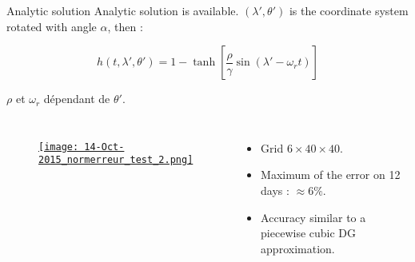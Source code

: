 \documentclass[11pt]{beamer}
\begin{document}
\begin{frame}{Analytic solution}
Analytic solution is available. $( \lambda', \theta')$ is the coordinate system rotated with angle $\alpha$, then :

$$h(t, \lambda', \theta') = 1 -\tanh \left[ \frac{\rho}{\gamma} \sin( \lambda' - \omega_r t ) \right]$$

$\rho$ et $\omega_r$ dépendant de $\theta'$.

\begin{columns}
\begin{figure}
\href{run:ref_7363145849_test_2.avi}{\texttt{[image: 14-Oct-2015\_normerreur\_test\_2.png]}} 
\end{figure}

\begin{itemize}
\item Grid $6 \times 40 \times 40$.
\item Maximum of the error on 12 days : $\approx 6 \%$.
\item Accuracy similar to a piecewise cubic DG approximation.
\end{itemize}

\end{columns}
\end{frame}

\end{document}
